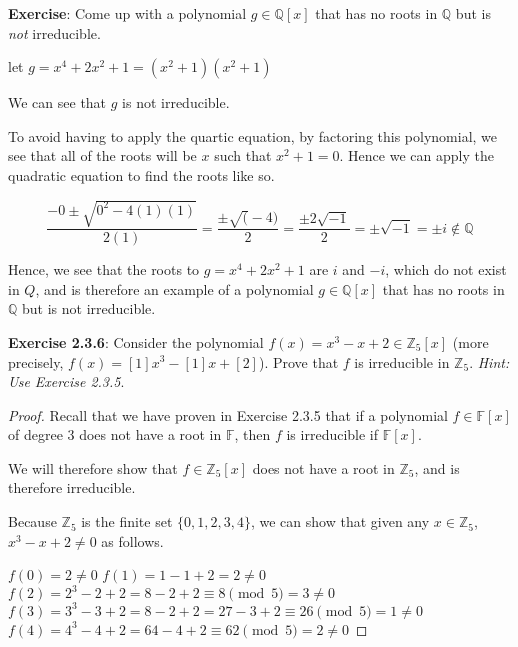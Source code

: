 \documentclass[a4paper]{article}
\begin{document}
\begin{myparindent}{0pt}
\textbf{Exercise}:
Come up with a polynomial $g \in \mathbb{Q}[x]$ that has no roots in $\mathbb{Q}$
but is \textit{not} irreducible. \newline

let $g = x^4 + 2x^2 + 1 = (x^2 + 1)(x^2 + 1)$ \newline

We can see that $g$ is not irreducible. \newline

To avoid having to apply the quartic equation, by factoring this polynomial, we
see that all of the roots will be $x$ such that $x^2 + 1 = 0$. Hence we can
apply the quadratic equation to find the roots like so.

\[
  \frac{-0 \pm \sqrt{0^2 - 4(1)(1)}}{2(1)} = \frac{\pm \sqrt(-4)}{2} =
  \frac{\pm 2 \sqrt{-1}}{2} = \pm \sqrt{-1} = \pm i \notin \mathbb{Q}
\]

Hence, we see that the roots to $g = x^4 + 2x^2 + 1$ are $i$ and $-i$, which
do not exist in $Q$, and is therefore an example of a polynomial
$g \in \mathbb{Q}[x]$ that has no roots in $\mathbb{Q}$ but is not irreducible.
\newline

\textbf{Exercise 2.3.6}:
Consider the polynomial $f(x) = x^3 - x + 2 \in \mathbb{Z}_5[x]$ (more precisely,
$f(x) = [1]x^3 - [1]x + [2]$). Prove that $f$ is irreducible in $\mathbb{Z}_5$.
\textit{Hint: Use Exercise 2.3.5}.
\newline
\begin{proof}
  Recall that we have proven in Exercise 2.3.5 that if a polynomial
  $f \in \mathbb{F}[x]$ of degree 3 does not have a root in $\mathbb{F}$, then
  $f$ is irreducible if $\mathbb{F}[x]$. \newline

  We will therefore show that $f \in \mathbb{Z}_5[x]$ does not have a root in
  $\mathbb{Z}_5$, and is therefore irreducible. \newline

  Because $\mathbb{Z}_5$ is the finite set $\{0, 1, 2, 3, 4\}$, we can show
  that given any $x \in \mathbb{Z}_5$, $x^3 - x + 2 \neq 0$ as follows.
  \newline

  $f(0) = 2 \neq 0$ \newline
  $f(1) = 1 - 1 + 2 = 2 \neq 0$ \newline
  $f(2) = 2^3 - 2 + 2 = 8 - 2 + 2 \equiv 8 \pmod{5} = 3 \neq 0$ \newline
  $f(3) = 3^3 - 3 + 2 = 8 - 2 + 2 = 27 - 3 + 2 \equiv 26 \pmod{5} = 1 \neq 0$ \newline
  $f(4) = 4^3 - 4 + 2 = 64 - 4 + 2 \equiv 62 \pmod{5} = 2 \neq 0$ \newline


\end{proof}
\end{myparindent}
\end{document}
